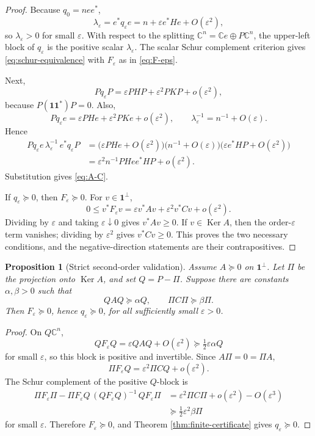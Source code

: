 \documentclass[11pt]{article}
\newtheorem{proposition}[theorem]{Proposition}
\newcommand{\one}{\mathbf 1}
\newcommand{\C}{\mathbb C}
\newcommand{\eps}{\varepsilon}
\newcommand{\Ker}{\operatorname{Ker}}
\begin{document}
\begin{proof}
Because \(q_0=nee^*\),
\[
  \lambda_\eps=e^*q_\eps e=n+\eps e^*He+O(\eps^2),
\]
so \(\lambda_\eps>0\) for small \(\eps\).  With respect to the splitting \(\C^n=\C e\oplus P\C^n\), the upper-left block of \(q_\eps\) is the positive scalar \(\lambda_\eps\).  The scalar Schur complement criterion gives \eqref{eq:schur-equivalence} with \(F_\eps\) as in \eqref{eq:F-eps}.

Next,
\[
  Pq_\eps P=\eps PHP+\eps^2PKP+o(\eps^2),
\]
because \(P(\one\one^*)P=0\).  Also,
\[
  Pq_\eps e=\eps PHe+\eps^2PKe+o(\eps^2),
  \qquad
  \lambda_\eps^{-1}=n^{-1}+O(\eps).
\]
Hence
\begin{align*}
  Pq_\eps e\,\lambda_\eps^{-1}\,e^*q_\eps P
  &=\bigl(\eps PHe+O(\eps^2)\bigr)
    \bigl(n^{-1}+O(\eps)\bigr)
    \bigl(\eps e^*HP+O(\eps^2)\bigr)\\
  &=\eps^2 n^{-1}PHee^*HP+o(\eps^2).
\end{align*}
Substitution gives \eqref{eq:A-C}.

If \(q_\eps\succeq0\), then \(F_\eps\succeq0\).  For \(v\in\one^\perp\),
\[
  0\le v^*F_\eps v
  =\eps v^*Av+\eps^2v^*Cv+o(\eps^2).
\]
Dividing by \(\eps\) and taking \(\eps\downarrow0\) gives \(v^*Av\ge0\).  If \(v\in\Ker A\), then the order-\(\eps\) term vanishes; dividing by \(\eps^2\) gives \(v^*Cv\ge0\).  This proves the two necessary conditions, and the negative-direction statements are their contrapositives.
\end{proof}

\begin{proposition}[Strict second-order validation]
\label{prop:sufficiency}
Assume \(A\succeq0\) on \(\one^\perp\).  Let \(\Pi\) be the projection onto \(\Ker A\), and set \(Q=P-\Pi\).  Suppose there are constants \(\alpha,\beta>0\) such that
\begin{equation}
  QAQ\succeq \alpha Q,
  \qquad
  \Pi C\Pi\succeq \beta \Pi.
  \label{eq:strict-margins}
\end{equation}
Then \(F_\eps\succeq0\), hence \(q_\eps\succeq0\), for all sufficiently small \(\eps>0\).
\end{proposition}

\begin{proof}
On \(Q\C^n\),
\[
  QF_\eps Q=\eps QAQ+O(\eps^2)\succeq \tfrac12\eps\alpha Q
\]
for small \(\eps\), so this block is positive and invertible.  Since \(A\Pi=0=\Pi A\),
\[
  \Pi F_\eps Q=\eps^2\Pi C Q+o(\eps^2).
\]
The Schur complement of the positive \(Q\)-block is
\begin{align*}
  \Pi F_\eps\Pi
  -\Pi F_\eps Q\,(QF_\eps Q)^{-1}\,QF_\eps\Pi
  &=\eps^2\Pi C\Pi+o(\eps^2)-O(\eps^3)\\
  &\succeq \tfrac12\eps^2\beta\Pi
\end{align*}
for small \(\eps\).  Therefore \(F_\eps\succeq0\), and Theorem \ref{thm:finite-certificate} gives \(q_\eps\succeq0\).
\end{proof}
\end{document}
